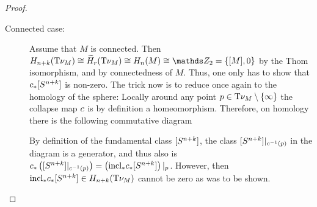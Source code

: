 \begin{Lem}
\begin{proof}
    \begin{description}
    \item[Connected case:]
      Assume that $M$ is connected.
      Then
      $\H_{n+k}(\Thomspace{\N M})
      \cong\relH_r(\Thomspace{\N M})
      \cong \H_n(M) \cong \Zmod2=\{\fundcl M, 0\}$ by
      the Thom isomorphism, and by connectedness of $M$.
      Thus, one only has to show that
      ${c}_*[S^{n+k}]$
      is non-zero.    
      The trick now is to reduce once again to the homology of the
      sphere:
      Locally around any point $p\in\mathrm{T}{\nu_{M}}\setminus\{\infty\}$ the
      collapse map $c$ is by definition a
      homeomorphism. Therefore, on homology there is the following 
      commutative diagram
      \begin{center}
      \end{center}
      By definition of the fundamental class $[S^{n+k}]$,
      the class $[S^{n+k}]|_{c^{-1}(p)}$ in the
      diagram is a generator, and thus also is
      ${c}_*\left([S^{n+k}]|_{c^{-1}(p)}\right)
      = \left({\mathrm{incl}}_*{c}_*[S^{n+k}]\right)|_p$.
      However, then ${\mathrm{incl}}_*{c}_*[S^{n+k}]\in
      H_{n+k}(\mathrm{T}{\nu_{M}})$
      cannot be zero as was to be shown.


\end{description}
\end{proof}
\end{Lem}
